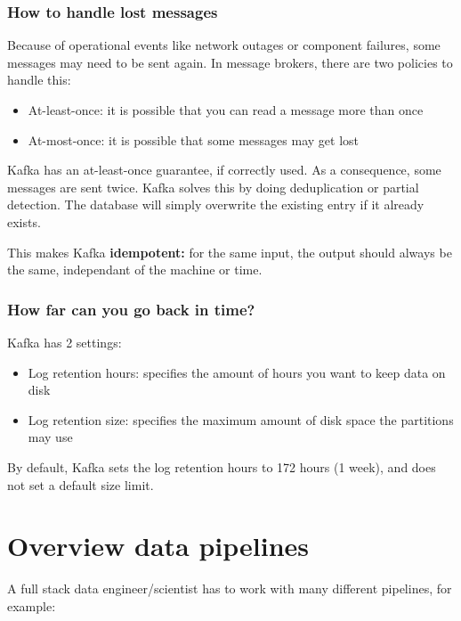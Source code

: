 \documentclass{article}
\begin{document}
\subsubsection{How to handle lost messages}

Because of operational events like network outages or component failures, some messages
may need to be sent again. In message brokers, there are two policies to handle this:

\begin{itemize}
    \item At-least-once: it is possible that you can read a message more than once
    \item At-most-once: it is possible that some messages may get lost
\end{itemize}

Kafka has an at-least-once guarantee, if correctly used. 
As a consequence, some messages are sent twice. 
Kafka solves this by doing deduplication or partial detection.
The database will simply overwrite the existing entry if it already exists.

This makes Kafka \textbf{idempotent:} for the same input, the output should always be
the same, independant of the machine or time.

\subsubsection{How far can you go back in time?}

Kafka has 2 settings:

\begin{itemize}
    \item Log retention hours: specifies the amount of hours you want to keep data on disk
    \item Log retention size: specifies the maximum amount of disk space the partitions may use 
\end{itemize}

By default, Kafka sets the log retention hours to 172 hours (1 week), and does not set a default size limit.

\section{Overview data pipelines}
A full stack data engineer/scientist has to work with many different pipelines, for example:
\end{document}
